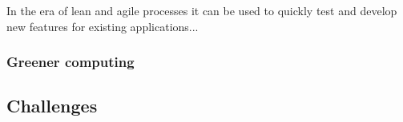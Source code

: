 In the era of lean and agile processes it can be used to quickly test and develop new features for existing applications... %


\subsubsection*{Greener computing}


\subsection{Challenges}









